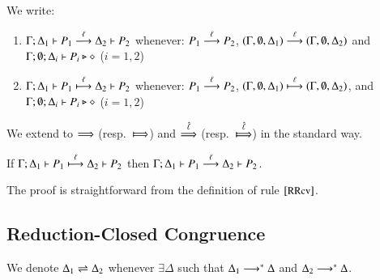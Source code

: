 \begin{definition}\label{d:tlts}\rm
We write: 
\begin{enumerate}
\item 
$\Gamma; \Delta_1 \vdash P_1 \stackrel{\ell}{\longrightarrow} \Delta_2 \vdash P_2$
	whenever:
%
$P_1 \stackrel{\ell}{\longrightarrow} P_2$, $(\Gamma, \emptyset, \Delta_1) \stackrel{\ell}{\longrightarrow} (\Gamma, \emptyset, \Delta_2)$ and $\Gamma; \emptyset; \Delta_i \vdash P_i \triangleright \diamond$ 
($i=1,2$)
%
\item 
$\Gamma; \Delta_1 \vdash P_1 \stackrel{\ell}{\longmapsto} \Delta_2 \vdash P_2$
whenever: 
$P_1 \stackrel{\ell}{\longrightarrow} P_2$, 
$(\Gamma, \emptyset, \Delta_1) \stackrel{\ell}{\longmapsto} (\Gamma, \emptyset, \Delta_2)$, 
and $\Gamma; \emptyset; \Delta_i \vdash P_i \triangleright \diamond$ 
($i=1,2$)
\end{enumerate}
%
We extend to $\stackrel{}{\Longrightarrow}$ (resp.\ $\Hby{}$) and $\stackrel{\hat{\ell}}{\Longrightarrow}$ (resp.\ $\Hby{\hat{\ell}}$) in the standard way.
\end{definition}



\begin{lemma}[Invariant]\label{l:invariant}
	If $\Gamma; \Delta_1 \vdash P_1 \stackrel{\ell}{\longmapsto} \Delta_2 \vdash P_2$
	then $\Gamma; \Delta_1 \vdash P_1 \stackrel{\ell}{\longrightarrow} \Delta_2 \vdash P_2$.
\end{lemma}

\begin{IEEEproof}
	The proof is straightforward from the definition of rule $\eltsrule{RRcv}$.
\end{IEEEproof}


\subsection{Reduction-Closed Congruence}
\label{subsec:rc}

\begin{definition}\rm
	We denote $\Delta_1 \rightleftharpoons \Delta_2$ whenever $\exists \Delta$ such that
	$\Delta_1 \longrightarrow^\ast \Delta$ and $\Delta_2 \longrightarrow^\ast \Delta$.
\end{definition}

